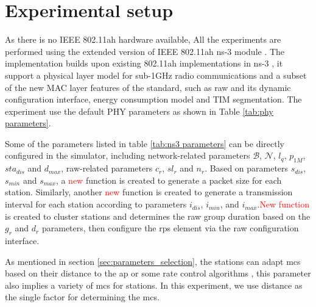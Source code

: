 \section{Experimental setup \label{sec:setup}}


As there is no IEEE 802.11ah hardware available, All the experiments are performed using the extended version of IEEE 802.11ah ns-3 module \cite{WNS32018}. The implementation builds upon existing 802.11ah implementations in ns-3 \cite{wns32016}, it support a physical layer model for sub-1GHz radio communications and a subset of the new MAC layer features of the standard, such as \gls{raw} and its dynamic configuration interface, energy consumption model and TIM segmentation. The experiment use the default PHY parameters as shown in Table \ref{tab:phy parameters}.

Some of the parameters listed in table \ref{tab:ns3 parameters} can be directly configured in the simulator, including network-related parameters $\mathcal{B}$, $\mathcal{N}$, $l_q$,  $p_\textit{1M}$, $sta_\textit{dis}$ and $d_\textit{max}$, \gls{raw}-related parameters $c_r$, $\textit{sl}_r$ and $n_r$. Based on parameters  $s_\textit{dis}$, $s_\textit{min}$ and $s_\textit{max}$, a \textcolor{red}{new}  function is created to generate a packet size for each station. Similarly, another \textcolor{red}{new} function is created to generate a transmission interval for each station according to parameters $i_\textit{dis}$, $i_\textit{min}$, and $i_\textit{max}$.\textcolor{red}{New function} is created to cluster stations and determines the \gls{raw} group duration based on the $g_r$ and $d_r$ parameters, then configure the rps element via the \gls{raw} configuration interface.

As mentioned in section \ref{sec:parameters_selection}, the stations can adapt \gls{mcs} based on their distance to the \gls{ap} or some rate control algorithms \cite{rca2006}, this parameter also implies a variety of \gls{mcs} for stations. In this experiment, we use distance as the single factor for determining the \gls{mcs}.

  






